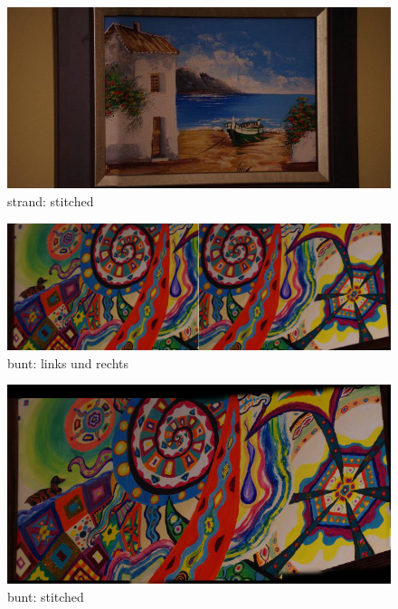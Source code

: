 \documentclass[deutsch]{scrartcl}
\begin{document}
\begin{figure}[h!]
\begin{center}
\includegraphics[width=1.0\textwidth]{strandS.png}
\caption{strand: stitched}
\label{fig:strandS}
\end{center}
\end{figure}

\begin{figure}[h!]
\begin{center}
\includegraphics[width=1.0\textwidth]{bunt.jpg}
\caption{bunt: links und rechts}
\label{fig:bunt}
\end{center}
\end{figure}

\begin{figure}[h!]
\begin{center}
\includegraphics[width=1.0\textwidth]{buntS.png}
\caption{bunt: stitched}
\label{fig:buntS}
\end{center}
\end{figure}
\end{document}
